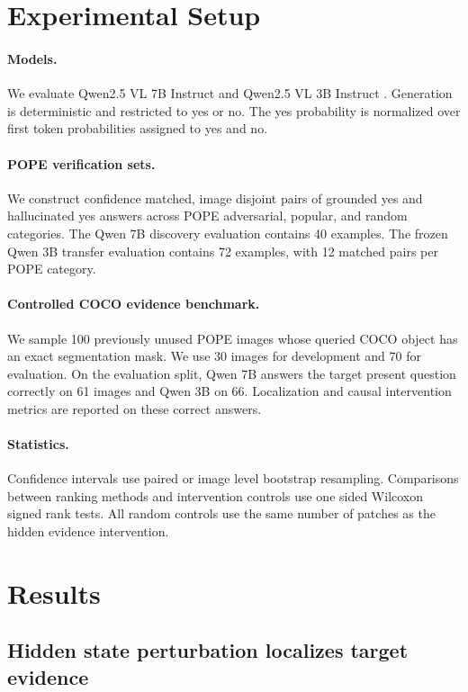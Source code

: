 \documentclass{article}
\begin{document}
\section{Experimental Setup}

\paragraph{Models.}
We evaluate Qwen2.5 VL 7B Instruct and Qwen2.5 VL 3B Instruct \citep{bai2025qwen25vl}. Generation is deterministic and restricted to yes or no. The yes probability is normalized over first token probabilities assigned to yes and no.

\paragraph{POPE verification sets.}
We construct confidence matched, image disjoint pairs of grounded yes and hallucinated yes answers across POPE adversarial, popular, and random categories. The Qwen 7B discovery evaluation contains 40 examples. The frozen Qwen 3B transfer evaluation contains 72 examples, with 12 matched pairs per POPE category.

\paragraph{Controlled COCO evidence benchmark.}
We sample 100 previously unused POPE images whose queried COCO object has an exact segmentation mask. We use 30 images for development and 70 for evaluation. On the evaluation split, Qwen 7B answers the target present question correctly on 61 images and Qwen 3B on 66. Localization and causal intervention metrics are reported on these correct answers.

\paragraph{Statistics.}
Confidence intervals use paired or image level bootstrap resampling. Comparisons between ranking methods and intervention controls use one sided Wilcoxon signed rank tests. All random controls use the same number of patches as the hidden evidence intervention.

\section{Results}

\subsection{Hidden state perturbation localizes target evidence}
\end{document}

